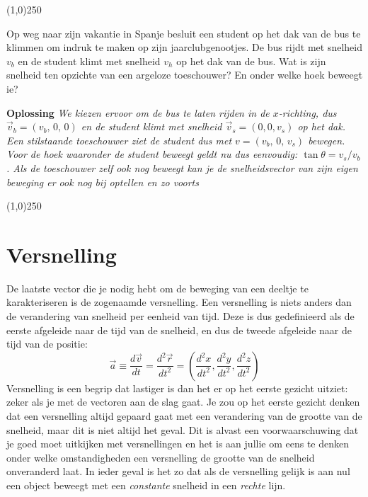 \begin{center}
\line(1,0){250}
\end{center}
\begin{voorbeeld} 
\label{ex:student}
Op weg naar zijn vakantie in Spanje besluit een student op het dak van de bus te klimmen om 
indruk te maken op zijn jaarclubgenootjes. De bus rijdt met snelheid $v_b$ en de student klimt met 
snelheid $v_h$ op het dak van de bus. Wat is zijn snelheid ten opzichte van een argeloze 
toeschouwer? En onder welke hoek beweegt ie?

{\bf Oplossing} {\it We kiezen ervoor om de bus te laten rijden in de $x$-richting, 
dus $\vec{v}_b=(v_b,\,0,\,0)$
en de student klimt met snelheid $\vec{v}_s = (0,0,v_s)$ op het dak. Een stilstaande toeschouwer 
ziet de student dus met $v = (v_b,\,0,\,v_s)$ bewegen. Voor de hoek waaronder de student 
beweegt geldt nu dus eenvoudig: $\tan\theta = v_s / v_b$. Als de toeschouwer zelf ook nog 
beweegt kan je de snelheidsvector van zijn eigen beweging er ook nog bij optellen en zo voorts
}
\end{voorbeeld}

\begin{center}
\line(1,0){250}
\end{center}

\section{Versnelling}

De laatste vector die je nodig hebt om de beweging van een deeltje te karakteriseren is de 
zogenaamde versnelling. Een versnelling is niets anders dan de verandering van snelheid per 
eenheid van tijd. Deze is dus gedefinieerd als de eerste afgeleide naar de tijd van de snelheid, en 
dus de tweede afgeleide naar de tijd van de positie:
\begin{equation}
\label{eq:a}
\vec{a} \equiv \frac{d\vec{v}}{dt} = \frac{d^2\vec{r}}{dt^2} = \left(\frac{d^2x}{dt^2}, \frac{d^2y}{dt^2}, 
\frac{d^2z}{dt^2}\right)
\end{equation}
Versnelling is een begrip dat lastiger is dan het er op het eerste gezicht uitziet: zeker als je met de 
vectoren aan de slag gaat. Je zou op het eerste gezicht denken dat een versnelling altijd gepaard 
gaat met een verandering van de grootte van de snelheid, maar dit is niet altijd het geval. Dit is 
alvast een voorwaarschuwing dat je goed moet uitkijken met versnellingen en het is aan jullie om 
eens te denken onder welke omstandigheden een versnelling de grootte van de snelheid 
onveranderd laat. In ieder geval is het zo dat als de versnelling gelijk is aan nul een object beweegt 
met een {\it constante} snelheid in een {\it rechte} lijn.


